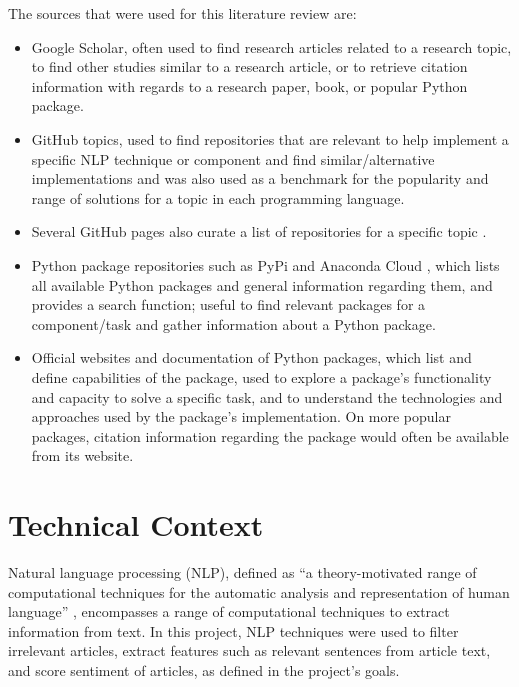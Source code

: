 \documentclass{report}
\begin{document}
The sources that were used for this literature review are:
\begin{itemize}
	\item Google Scholar, often used to find research articles related to a research topic, to find other studies similar to a research article, or to retrieve citation information with regards to a research paper, book, or popular Python package.
	\item GitHub topics, used to find repositories that are relevant to help implement a specific NLP technique or component and find similar/alternative implementations and was also used as a benchmark for the popularity and range of solutions for a topic in each programming language.
	\item Several GitHub pages also curate a list of repositories for a specific topic \cite{awesome-sentiment-analysis, awesome-nlp, awesome-machine-learning}.
	\item Python package repositories such as PyPi \cite{PyPi} and Anaconda Cloud \cite{Anaconda-Cloud}, which lists all available Python packages and general information regarding them, and provides a search function; useful to find relevant packages for a component/task and gather information about a Python package.
	\item Official websites and documentation of Python packages, which list and define capabilities of the package, used to explore a package's functionality and capacity to solve a specific task, and to understand the technologies and approaches used by the package's implementation. 
		On more popular packages, citation information regarding the package would often be available from its website.
\end{itemize}

\section{Technical Context} \label{Technical Context}  %

Natural language processing (NLP), defined as ``a theory-motivated range of computational techniques for the automatic analysis and representation of human language'' \cite{cambria2014jumping}, encompasses a range of computational techniques to extract information from text.
In this project, NLP techniques were used to filter irrelevant articles, extract features such as relevant sentences from article text, and score sentiment of articles, as defined in the project's goals.
\end{document}
